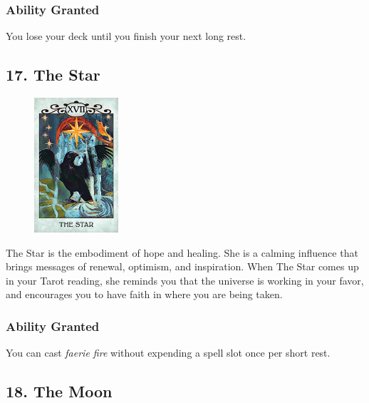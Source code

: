 \documentclass[10pt,twoside,twocolumn,openany,nodeprecatedcode]{dndbook}
\begin{document}
    \subsubsection*{Ability Granted}
    You lose your deck until you finish your next long rest. 

    \newpage

    \subsection*{17. The Star}

    \begin{figure}
        \includegraphics[height=5cm,width=\linewidth]{star.jpg}
    \end{figure}
    The Star is the embodiment of hope and healing. She is a calming influence that brings messages of renewal, optimism, and inspiration. When The Star comes up in your Tarot reading, she reminds you that the universe is working in your favor, and encourages you to have faith in where you are being taken.

    \subsubsection*{Ability Granted}
    You can cast \emph{faerie fire} without expending a spell slot once per short rest.

    \subsection*{18. The Moon}
\end{document}
